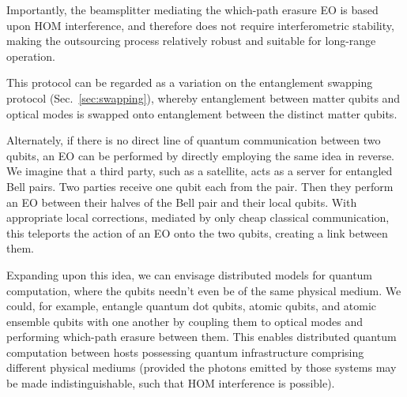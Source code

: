 Importantly, the beamsplitter mediating the which-path erasure EO is based upon HOM interference, and therefore does not require interferometric stability, making the outsourcing process relatively robust and suitable for long-range operation.

This protocol can be regarded as a variation on the entanglement swapping protocol (Sec.~\ref{sec:swapping}), whereby entanglement between matter qubits and optical modes is swapped onto entanglement between the distinct matter qubits.

Alternately, if there is no direct line of quantum communication between two qubits, an EO can be performed by directly employing the same idea in reverse. We imagine that a third party, such as a satellite, acts as a server for entangled Bell pairs. Two parties receive one qubit each from the pair. Then they perform an EO between their halves of the Bell pair and their local qubits. With appropriate local corrections, mediated by only cheap classical communication, this teleports the action of an EO onto the two qubits, creating a link between them.

Expanding upon this idea, we can envisage distributed models for quantum computation, where the qubits needn't even be of the same physical medium. We could, for example, entangle quantum dot qubits, atomic qubits, and atomic ensemble qubits with one another by coupling them to optical modes and performing which-path erasure between them. This enables distributed quantum computation between hosts possessing quantum infrastructure comprising different physical mediums (provided the photons emitted by those systems may be made indistinguishable, such that HOM interference is possible).

